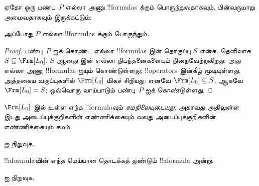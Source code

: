 \documentclass[../../../include/open-logic-section]{subfiles}
\begin{document}


\begin{thm}
  ஏதோ ஒரு பண்பு~$P$ எல்லா அணு !!{formula}s க்கும் பொருந்துவதாகவும்,
  பின்வருமாறு அமைவதாகவும் இருக்கட்டும்:
  \begin{enumerate}
  \end{enumerate}
  அப்போது $P$ எல்லா !!{formula}s க்கும் பொருந்தும்.
\end{thm}

\begin{proof}
  பண்பு~$P$ ஐக் கொண்ட எல்லா !!{formula}s இன் தொகுப்பு $S$ என்க.
  தெளிவாக $S \subseteq \Frm[L_0]$. $S$ ஆனது
   இன் எல்லா நிபந்தனைகளையும் நிறைவேற்றுகிறது:
  அது எல்லா அணு !!{formula}s ஐயும் கொண்டுள்ளது; !!{operator}s இன்கீழ்
  மூடியுள்ளது. அத்தகைய வகுப்புகளில் $\Frm[L_0]$ மிகச் சிறியது; எனவே
  $\Frm[L_0] \subseteq S$. ஆகவே $\Frm[L_0] = S$; ஒவ்வொரு வாய்பாடும்
  பண்பு~$P$ ஐக் கொண்டுள்ளது.
\end{proof}

\begin{prop}
   $\Frm[L_0]$ இல் உள்ள எந்த !!{formula}வும் \emph{சமநிலையுடையது};
   அதாவது அதிலுள்ள இடது அடைப்புக்குறிகளின் எண்ணிக்கையும் வலது
   அடைப்புக்குறிகளின் எண்ணிக்கையும் சமம்.
\end{prop}

\begin{prob}
 ஐ நிறுவுக.
\end{prob}

\begin{prop} 
!!a{formula}வின் எந்த மெய்யான தொடக்கத் துண்டும் !!a{formula} அன்று.
\end{prop}

\begin{prob}
   ஐ நிறுவுக.
\end{prob}
\end{document}
